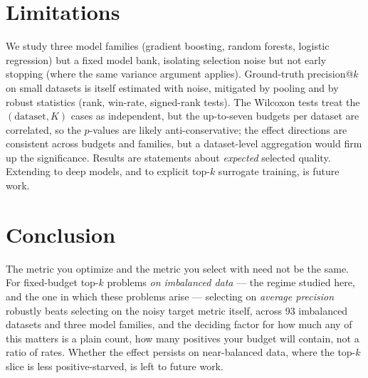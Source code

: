 \documentclass[11pt]{article}
\begin{document}
\section{Limitations}
We study three model families (gradient boosting, random forests, logistic regression) but a
fixed model bank, isolating selection noise but not early stopping (where the same variance
argument applies). Ground-truth precision@$k$ on small datasets is itself estimated with
noise, mitigated by pooling and by robust statistics (rank, win-rate, signed-rank tests).
The Wilcoxon tests treat the $(\text{dataset}, K)$ cases as independent, but the up-to-seven
budgets per dataset are correlated, so the $p$-values are likely anti-conservative; the effect
directions are consistent across budgets and families, but a dataset-level aggregation would
firm up the significance. Results are statements about \emph{expected} selected quality.
Extending to deep models, and to explicit top-$k$ surrogate training, is future work.

\section{Conclusion}
The metric you optimize and the metric you select with need not be the same. For fixed-budget
top-$k$ problems \emph{on imbalanced data} --- the regime studied here, and the one in which
these problems arise --- selecting on \emph{average precision} robustly beats selecting on the
noisy target metric itself, across 93 imbalanced datasets and three model families, and the
deciding factor for how much any of this matters is a plain count, how many positives your
budget will contain, not a ratio of rates. Whether the effect persists on
near-balanced data, where the top-$k$ slice is less positive-starved, is left to future work.
\end{document}

